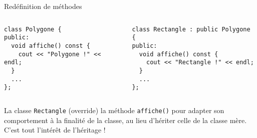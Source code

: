 \documentclass[c]{beamer}
\newcommand{\inline}[1]{\texttt{#1}}
\begin{document}

\begin{frame}[fragile]{Redéfinition de méthodes}

\begin{columns}
\begin{column}{0.5\columnwidth}
\begin{verbatim}
class Polygone {
public:
  void affiche() const {
    cout << "Polygone !" << endl;
  }
  ...
};
\end{verbatim}
\end{column}
\begin{column}{0.5\columnwidth}
\begin{verbatim}
class Rectangle : public Polygone {
public:
  void affiche() const {
    cout << "Rectangle !" << endl;
  }
  ...
};
\end{verbatim}
\end{column}
\end{columns}
\vspace{7em}
La classe \inline{Rectangle}  (override) la méthode \inline{affiche()} pour adapter son comportement à la finalité de la classe, au lieu d'hériter celle de la classe mère. C'est tout l'intérêt de l'héritage !
\end{frame}

\end{document}
